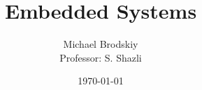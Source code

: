 


\pagestyle{fancy}

\title{Embedded Systems}
\date{\today}
\author{Michael Brodskiy\\ \small Professor: S. Shazli}



\maketitle

\thispagestyle{fancy}

